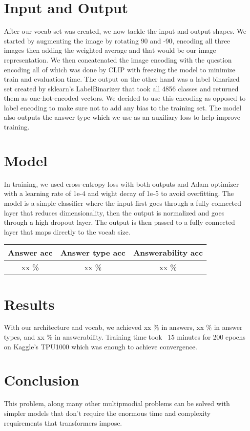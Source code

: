\documentclass[12pt]{IEEEtran}
\begin{document}
\section{Input and Output}
After our vocab set was created, we now tackle the input and output shapes. We started by augmenting the image by rotating 90 and -90, encoding all three images then adding the weighted average and that would be our image representation. We then concatenated the image encoding with the question encoding all of which was done by CLIP with freezing the model to minimize train and evaluation time. The output on the other hand was a label binarized set created by sklearn’s LabelBinarizer that took all 4856 classes and returned them as one-hot-encoded vectors. We decided to use this encoding as opposed to label encoding to make sure not to add any bias to the training set. The model also outputs the answer type which we use as an auxiliary loss to help improve training.

\section{Model}
In training, we used cross-entropy loss with both outputs and Adam optimizer with a learning rate of 1e-4 and wight decay of 1e-5 to avoid overfitting. The model is a simple classifier where the input first goes through a fully connected layer that reduces dimensionality, then the output is normalized and goes through a high dropout layer. The output is then passed to a fully connected layer that maps directly to the vocab size. 

\begin{table}
\begin{tabular}{|c|c|c|}
\hline
 Answer acc & Answer type acc & Answerability acc\\ \hline
 xx \% & xx \%  & xx \% \\ \hline
\end{tabular}
\end{table}

\section{Results}
With our architecture and vocab, we achieved xx \% in answers, xx \% in answer types, and xx \% in answerability. Training time took ~15 minutes for 200 epochs on Kaggle’s TPU1000 which was enough to achieve convergence.

\section{Conclusion}
This problem, along many other multipmodial problems can be solved with simpler models that don’t require the enormous time and complexity requirements that transformers impose.

\printbibliography
\end{document}
